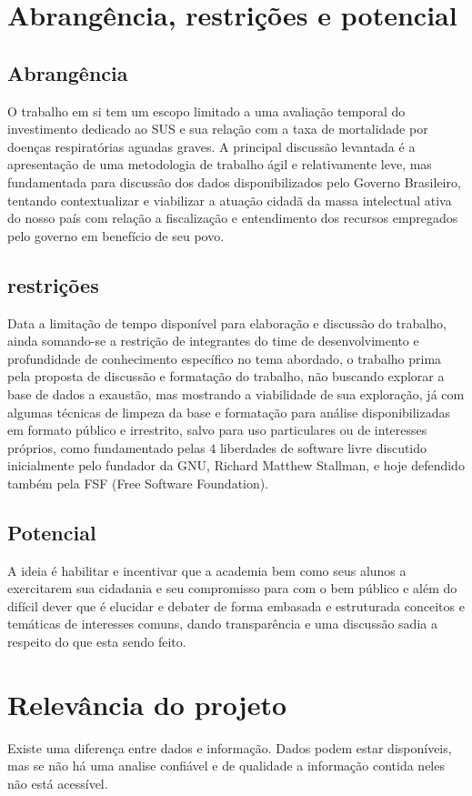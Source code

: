 \documentclass[journal]{IEEEtran}
\begin{document}
\section{Abrangência, restrições e potencial}
\subsection{Abrangência}
O trabalho em si tem um escopo limitado a uma avaliação temporal do investimento dedicado ao SUS e sua relação com a taxa de mortalidade por doenças respiratórias aguadas graves. 
A principal discussão levantada é a apresentação de uma metodologia de trabalho ágil e relativamente leve, mas  fundamentada para discussão dos dados disponibilizados pelo Governo Brasileiro, tentando contextualizar e viabilizar a atuação cidadã da massa intelectual ativa do nosso país com relação a fiscalização e entendimento dos recursos empregados pelo governo em benefício de seu povo.

\subsection{restrições}
Data a limitação de tempo disponível para elaboração e discussão do trabalho, ainda somando-se a restrição de integrantes do time de desenvolvimento e profundidade de conhecimento específico no tema abordado, o trabalho prima pela proposta de discussão e formatação do trabalho, não buscando explorar a base de dados a exaustão, mas mostrando a viabilidade de sua exploração, já com algumas técnicas de limpeza da base e formatação para análise disponibilizadas em formato público e irrestrito, salvo para uso particulares ou de interesses próprios, como fundamentado pelas 4 liberdades de software livre \cite{gnu} discutido inicialmente pelo fundador da GNU, Richard Matthew Stallman, e hoje defendido também pela FSF (Free Software Foundation).

\subsection{Potencial}
A ideia é habilitar e incentivar que a academia bem como seus alunos a exercitarem sua cidadania e seu compromisso para com o bem público e além do difícil dever que é elucidar e debater de forma embasada e estruturada conceitos e temáticas de interesses comuns, dando transparência e uma discussão sadia a respeito do que esta sendo feito.

\section{Relevância do projeto}
Existe uma diferença entre dados e informação. Dados podem estar disponíveis, mas se não há uma analise confiável e de qualidade a informação contida neles não está acessível.
\end{document}
